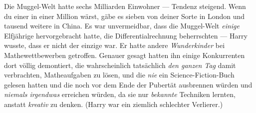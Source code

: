 Die Muggel-Welt hatte sechs Milliarden Einwohner — Tendenz steigend. Wenn du einer in einer Million wärst, gäbe es sieben von deiner Sorte in London und tausend weitere in China. Es war unvermeidbar, dass die Muggel-Welt \emph{einige} Elfjährige hervorgebracht hatte, die Differentialrechnung beherrschten — Harry wusste, dass er nicht der einzige war. Er hatte andere \emph{Wunderkinder} bei Mathewettbewerben getroffen. Genauer gesagt hatten ihn einige Konkurrenten dort völlig demontiert, die wahrscheinlich tatsächlich \emph{den ganzen Tag} damit verbrachten, Matheaufgaben zu lösen, und die \emph{nie} ein Science-Fiction-Buch gelesen hatten und die noch vor dem Ende der Pubertät ausbrennen würden und \emph{niemals irgendwas} erreichen würden, da sie nur \emph{bekannte} Techniken lernten, anstatt \emph{kreativ} zu denken. (Harry war ein ziemlich schlechter Verlierer.)


